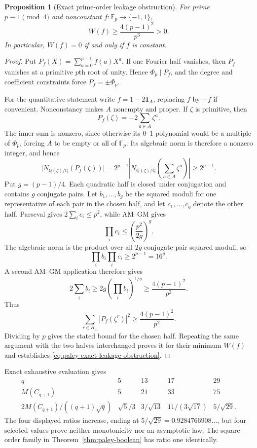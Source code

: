 \documentclass[11pt]{article}
\newtheorem{proposition}[theorem]{Proposition}
\newcommand{\eps}{\{-1,1\}}
\begin{document}
\begin{proposition}[Exact prime-order leakage obstruction]
\label{prop:paley-exact-leakage-obstruction}
For prime $p\equiv1\pmod4$ and nonconstant $f:\mathbb F_p\to\eps$,
\begin{equation}
 W(f)\ge\frac{4(p-1)^2}{p^3}>0.
 \label{eq:paley-exact-leakage-obstruction}
\end{equation}
In particular, $W(f)=0$ if and only if $f$ is constant.
\end{proposition}

\begin{proof}
Put $P_f(X)=\sum_{a=0}^{p-1}f(a)X^a$.  If one Fourier half vanishes, then
$P_f$ vanishes at a primitive $p$th root of unity.  Hence
$\Phi_p\mid P_f$, and the degree and coefficient constraints force
$P_f=\pm\Phi_p$.

For the quantitative statement write $f=1-2\mathbf1_A$, replacing $f$ by
$-f$ if convenient.  Nonconstancy makes $A$ nonempty and proper.  If
$\zeta$ is primitive, then
\[
 P_f(\zeta)=-2\sum_{a\in A}\zeta^a.
\]
The inner sum is nonzero, since otherwise its $0$--$1$ polynomial would be a
multiple of $\Phi_p$, forcing $A$ to be empty or all of $\mathbb F_p$.
Its algebraic norm is therefore a nonzero integer, and hence
\[
 \bigl|N_{\mathbb Q(\zeta)/\mathbb Q}(P_f(\zeta))\bigr|
 =2^{p-1}\left|N_{\mathbb Q(\zeta)/\mathbb Q}
   \left(\sum_{a\in A}\zeta^a\right)\right|
 \ge2^{p-1}.
\]
Put
$g=(p-1)/4$.  Each quadratic half is closed under conjugation and contains
$g$ conjugate pairs.  Let $b_1,\ldots,b_g$ be the squared moduli for one
representative of each pair in the chosen half, and let
$c_1,\ldots,c_g$ denote the other half.  Parseval gives
$2\sum_i c_i\le p^2$, while AM--GM gives
\[
 \prod_i c_i\le\left(\frac{p^2}{2g}\right)^g.
\]
The algebraic norm is the product over all $2g$ conjugate-pair squared
moduli, so
\[
 \prod_i b_i\prod_i c_i\ge2^{p-1}=16^g.
\]
A second AM--GM application therefore gives
\[
 2\sum_i b_i\ge
 2g\left(\prod_i b_i\right)^{1/g}
 \ge\frac{4(p-1)^2}{p^2}.
\]
Thus
\[
 \sum_{r\in H_\pm}|P_f(\zeta^r)|^2
 \ge\frac{4(p-1)^2}{p^2}.
\]
Dividing by $p$ gives the stated bound for the chosen half.  Repeating the
same argument with the two halves interchanged proves it for their minimum
$W(f)$ and establishes \eqref{eq:paley-exact-leakage-obstruction}.
\end{proof}

Exact exhaustive evaluation gives
\[
\begin{array}{c|rrrr}
q&5&13&17&29\\ \hline
M(C_{q+1})&5&21&33&75\\
2M(C_{q+1})/((q+1)\sqrt q)
&\sqrt5/3&3/\sqrt{13}&11/(3\sqrt{17})&5/\sqrt{29}.
\end{array}
\]
The four displayed ratios increase, ending at
$5/\sqrt{29}=0.9284766908\ldots$, but four selected values prove neither
monotonicity nor an asymptotic law.  The square-order family in
Theorem~\ref{thm:paley-boolean} has ratio one identically.
\end{document}
